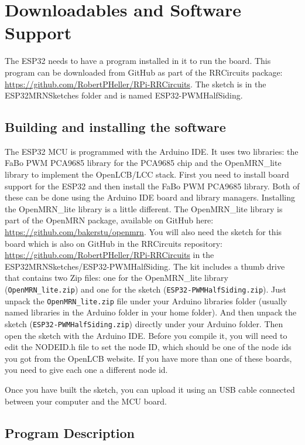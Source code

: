 \clearpage
\section{Downloadables and Software Support}

The ESP32 needs to have a program installed in it to run the board.  This 
program can be downloaded from GitHub as part of the RRCircuits package: 
\url{https://github.com/RobertPHeller/RPi-RRCircuits}. The sketch is in the 
ESP32MRNSketches folder and is named ESP32-PWMHalfSiding. 


\subsection{Building and installing the software}


The ESP32 MCU is programmed with the Arduino IDE. It uses two libraries: the
FaBo PWM PCA9685 library for the PCA9685 chip and the OpenMRN\_lite library to
implement the OpenLCB/LCC stack. First you need to install board support for
the ESP32 and then install the FaBo PWM PCA9685 library. Both of these can be
done using the Arduino IDE board and library managers. Installing the
OpenMRN\_lite library is a little different. The OpenMRN\_lite library is part
of the OpenMRN package, available on GitHub here:
\url{https://github.com/bakerstu/openmrn}. You will also need the sketch for
this board which is also on GitHub in the RRCircuits repository:
\url{https://github.com/RobertPHeller/RPi-RRCircuits} in the
ESP32MRNSketches/ESP32-PWMHalfSiding. The kit includes a thumb drive that
contains two Zip files: one for the OpenMRN\_lite library
(\texttt{OpenMRN\_lite.zip}) and one for the sketch
(\texttt{ESP32-PWMHalfSiding.zip}). Just unpack the \texttt{OpenMRN\_lite.zip}
file under your Arduino libraries folder (usually named libraries in the
Arduino folder in your home folder). And then unpack the sketch
(\texttt{ESP32-PWMHalfSiding.zip}) directly under your Arduino folder. Then
open the sketch with the Arduino IDE. Before you compile it, you will need to
edit the NODEID.h file to set the node ID, which should be one of the node ids
you got from the OpenLCB website. If you have more than one of these boards,
you need to give each one a different node id.

Once you have built the sketch, you can upload it using an USB cable connected 
between your computer and the MCU board.

\subsection{Program Description}

